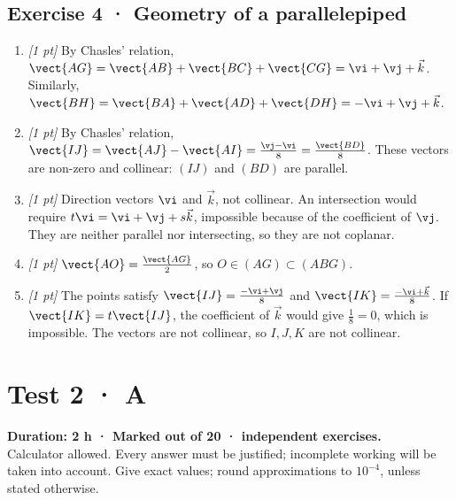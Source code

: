 \subsection*{Exercise 4 · Geometry of a parallelepiped}\begin{enumerate}

\item \textit{[1 pt]} By Chasles' relation, $\vect{AG}=\vect{AB}+\vect{BC}+\vect{CG}=\vi +\vj +\vec k$. Similarly, $\vect{BH}=\vect{BA}+\vect{AD}+\vect{DH}=-\vi +\vj +\vec k$.

\item \textit{[1 pt]} By Chasles' relation, $\vect{IJ}=\vect{AJ}-\vect{AI}=\frac{\vj -\vi }{8}=\frac{\vect{BD}}{8}$. These vectors are non-zero and collinear: $(IJ)$ and $(BD)$ are parallel.

\item \textit{[1 pt]} Direction vectors $\vi $ and $\vec k$, not collinear. An intersection would require $t\vi =\vi +\vj +s\vec k$, impossible because of the coefficient of $\vj $. They are neither parallel nor intersecting, so they are not coplanar.

\item \textit{[1 pt]} $\vect{AO}=\frac{\vect{AG}}{2}$, so $O\in(AG)\subset(ABG)$.

\item \textit{[1 pt]} The points satisfy $\vect{IJ}=\frac{-\vi +\vj }{8}$ and $\vect{IK}=\frac{-\vi +\vec k}{8}$. If $\vect{IK}=t\vect{IJ}$, the coefficient of $\vec k$ would give $\frac{1}{8}=0$, which is impossible. The vectors are not collinear, so $I,J,K$ are not collinear.

\end{enumerate}

\fi

\ifmxteacher

\mxnewpage{}\label{sujet:2-3}

\section*{Test 2 · A}


\textbf{Duration: 2 h · Marked out of 20 ·  independent exercises.}\\Calculator allowed. Every answer must be justified; incomplete working will be taken into account. Give exact values; round approximations to $10^{-4}$, unless stated otherwise.

